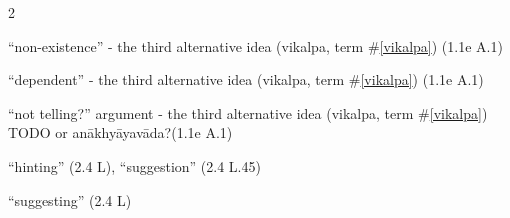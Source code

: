 \documentclass[10pt]{article}
\begin{document}
\begin{multicols}{2}
\begin{enumerate}[
			leftmargin=0em,
			rightmargin=0em,
		]

		 ``non-existence'' - the third alternative idea (vikalpa, term \#\ref{vikalpa}) (1.1e A.1)

		 ``dependent'' - the third alternative idea (vikalpa, term \#\ref{vikalpa}) (1.1e A.1)

		 ``not telling?'' argument - the third alternative idea (vikalpa, term \#\ref{vikalpa}) TODO or anākhyāyavāda?(1.1e A.1)




		 ``hinting'' (2.4 L),
		``suggestion'' (2.4 L.45)

		 ``suggesting'' (2.4 L)

	\end{enumerate}
\end{multicols}

\end{document}
